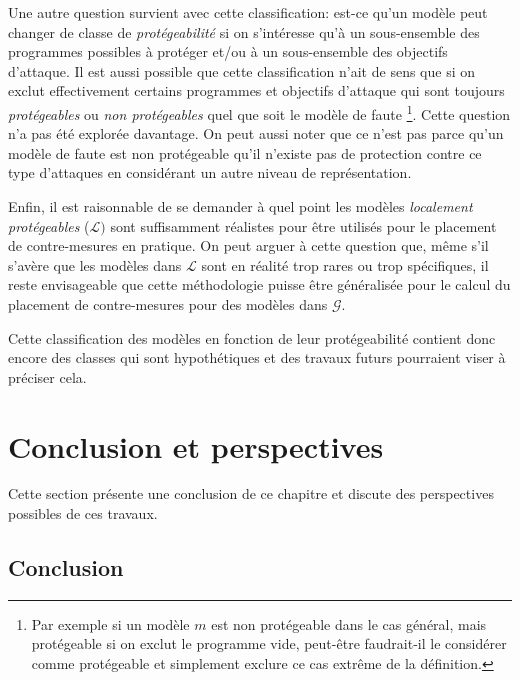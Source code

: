         Une autre question survient avec cette classification: est-ce qu'un modèle peut changer de classe de \textit{protégeabilité} si on s'intéresse qu'à un sous-ensemble des programmes possibles à protéger et/ou à un sous-ensemble des objectifs d'attaque.
        Il est aussi possible que cette classification n'ait de sens que si on exclut effectivement certains programmes et objectifs d'attaque qui sont toujours \textit{protégeables} ou \textit{non protégeables} quel que soit le modèle de faute \footnote{Par exemple si un modèle $m$ est non protégeable dans le cas général, mais protégeable si on exclut le programme vide, peut-être faudrait-il le considérer comme protégeable et simplement exclure ce cas extrême de la définition.}.
        Cette question n'a pas été explorée davantage.    
        On peut aussi noter que ce n'est pas parce qu'un modèle de faute est non protégeable qu'il n'existe pas de protection contre ce type d'attaques en considérant un autre niveau de représentation.
        
        Enfin, il est raisonnable de se demander à quel point les modèles \textit{localement protégeables} ($\mathcal{L})$ sont suffisamment réalistes pour être utilisés pour le placement de contre-mesures en pratique.
        On peut arguer à cette question que, même s'il s'avère que les modèles dans $\mathcal{L}$ sont en réalité trop rares ou trop spécifiques, il reste envisageable que cette méthodologie puisse être généralisée pour le calcul du placement de contre-mesures pour des modèles dans $\mathcal{G}$.
        
        Cette classification des modèles en fonction de leur protégeabilité contient donc encore des classes qui sont hypothétiques et des travaux futurs pourraient viser à préciser cela.
    
    \section{Conclusion et perspectives}
    \label{sec:placement-fw}
    
        Cette section présente une conclusion de ce chapitre et discute des perspectives possibles de ces travaux.
        
        \subsection{Conclusion}
        
